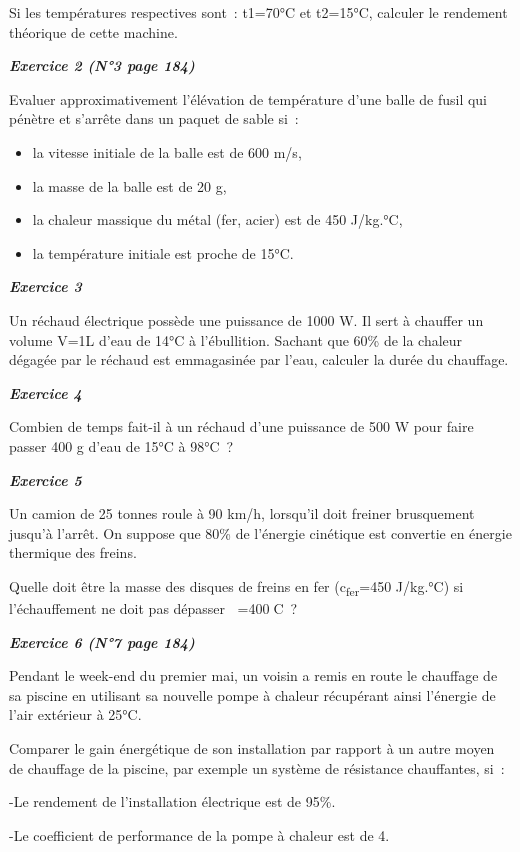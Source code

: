 Si les températures respectives sont~: t1=70°C et t2=15°C, calculer le
rendement théorique de cette machine.

\emph{\textbf{Exercice 2 (N°3 page 184)}}

Evaluer approximativement l'élévation de température d'une balle de
fusil qui pénètre et s'arrête dans un paquet de sable si~:

\begin{itemize}
\tightlist
\item
  la vitesse initiale de la balle est de 600 m/s,
\item
  la masse de la balle est de 20 g,
\item
  la chaleur massique du métal (fer, acier) est de 450 J/kg.°C,
\item
  la température initiale est proche de 15°C.
\end{itemize}

\emph{\textbf{Exercice 3}}

Un réchaud électrique possède une puissance de 1000 W. Il sert à
chauffer un volume V=1L d'eau de 14°C à l'ébullition. Sachant que 60\%
de la chaleur dégagée par le réchaud est emmagasinée par l'eau, calculer
la durée du chauffage.

\emph{\textbf{Exercice 4}}

Combien de temps fait-il à un réchaud d'une puissance de 500 W pour
faire passer 400 g d'eau de 15°C à 98°C~?

\emph{\textbf{Exercice 5}}

Un camion de 25 tonnes roule à 90 km/h, lorsqu'il doit freiner
brusquement jusqu'à l'arrêt. On suppose que 80\% de l'énergie cinétique
est convertie en énergie thermique des freins.

Quelle doit être la masse des disques de freins en fer
(c\textsubscript{fer}=450 J/kg.°C) si l'échauffement ne doit pas
dépasser =400C~?

\emph{\textbf{Exercice 6 (N°7 page 184)}}

Pendant le week-end du premier mai, un voisin a remis en route le
chauffage de sa piscine en utilisant sa nouvelle pompe à chaleur
récupérant ainsi l'énergie de l'air extérieur à 25°C.

Comparer le gain énergétique de son installation par rapport à un autre
moyen de chauffage de la piscine, par exemple un système de résistance
chauffantes, si~:

-Le rendement de l'installation électrique est de 95\%.

-Le coefficient de performance de la pompe à chaleur est de 4.

